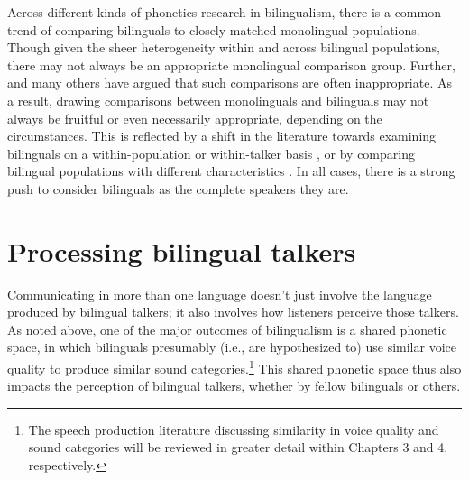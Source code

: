 Across different kinds of phonetics research in bilingualism, there is a common trend of comparing bilinguals to closely matched monolingual populations. Though given the sheer heterogeneity within and across bilingual populations, there may not always be an appropriate monolingual comparison group. Further, \citet{grosjean_1989_bilingual} and many others have argued that such comparisons are often inappropriate. As a result, drawing comparisons between monolinguals and bilinguals may not always be fruitful or even necessarily appropriate, depending on the circumstances. This is reflected by a shift in the literature towards examining bilinguals on a within-population \citep[e.g.,][]{chan_2020_lexically} or within-talker basis \citep[e.g.,][]{simonet_2019_convergence}, or by comparing bilingual populations with different characteristics \citep[e.g.,][]{brown_2009_phonological}. In all cases, there is a strong push to consider bilinguals as the complete speakers they are.


\section{Processing bilingual talkers}\label{ch1:sec:processing}

Communicating in more than one language doesn't just involve the language produced by bilingual talkers; it also involves how listeners perceive those talkers. As noted above, one of the major outcomes of bilingualism is a shared phonetic space, in which bilinguals presumably (i.e., are hypothesized to) use similar voice quality to produce similar sound categories.\footnote{The speech production literature discussing similarity in voice quality and sound categories will be reviewed in greater detail within Chapters 3 and 4, respectively.} This shared phonetic space thus also impacts the perception of bilingual talkers, whether by fellow bilinguals or others.

